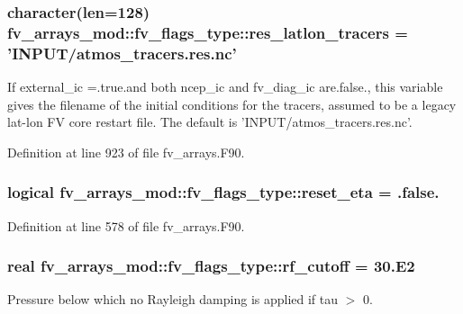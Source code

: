 \subsubsection[{res\-\_\-latlon\-\_\-tracers}]{\setlength{\rightskip}{0pt plus 5cm}character(len=128) fv\-\_\-arrays\-\_\-mod\-::fv\-\_\-flags\-\_\-type\-::res\-\_\-latlon\-\_\-tracers = 'I\-N\-P\-U\-T/atmos\-\_\-tracers.\-res.\-nc'}\label{structfv__arrays__mod_1_1fv__flags__type_a285c0d08ccf233b24be34bd178b3b2f8}


If external\-\_\-ic =.true.\-and both ncep\-\_\-ic and fv\-\_\-diag\-\_\-ic are.\-false., this variable gives the filename of the initial conditions for the tracers, assumed to be a legacy lat-\/lon F\-V core restart file. The default is 'I\-N\-P\-U\-T/atmos\-\_\-tracers.\-res.\-nc'. 



Definition at line 923 of file fv\-\_\-arrays.\-F90.

\subsubsection[{reset\-\_\-eta}]{\setlength{\rightskip}{0pt plus 5cm}logical fv\-\_\-arrays\-\_\-mod\-::fv\-\_\-flags\-\_\-type\-::reset\-\_\-eta = .false.}\label{structfv__arrays__mod_1_1fv__flags__type_ac04a40d72a3f3e54af07ec092498c80a}


Definition at line 578 of file fv\-\_\-arrays.\-F90.

\subsubsection[{rf\-\_\-cutoff}]{\setlength{\rightskip}{0pt plus 5cm}real fv\-\_\-arrays\-\_\-mod\-::fv\-\_\-flags\-\_\-type\-::rf\-\_\-cutoff = 30.E2}\label{structfv__arrays__mod_1_1fv__flags__type_af2f39702a51d8d256599d8e2aeb6cea8}


Pressure below which no Rayleigh damping is applied if tau $>$ 0. 



